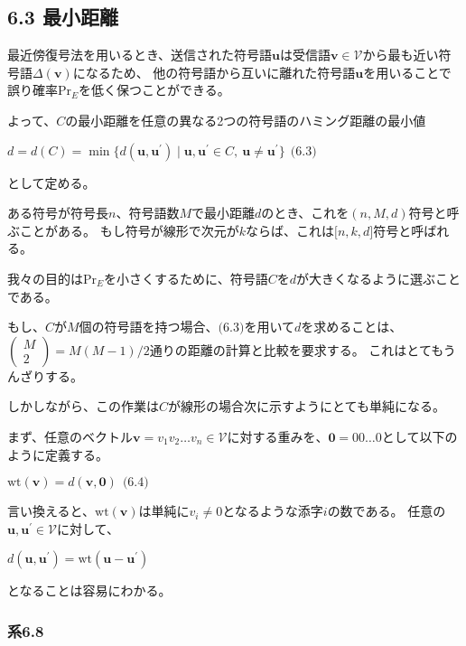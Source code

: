 \documentclass[12pt,a4paper]{article}
\begin{document}
\subsection*{6.3 最小距離}\label{ux6700ux5c0fux8dddux96e2}

最近傍復号法を用いるとき、送信された符号語$\mathbf{u}$は受信語$\mathbf{v} \in \mathcal{V}$から最も近い符号語$\Delta (\mathbf{v})$になるため、
他の符号語から互いに離れた符号語$\mathbf{u}$を用いることで誤り確率$\text{Pr}_E$を低く保つことができる。

よって、$C$の最小距離を任意の異なる2つの符号語のハミング距離の最小値

$d = d(C) = \min \lbrace d(\mathbf{u}, \mathbf{u}^\prime) \mid \mathbf{u}, \mathbf{u}^\prime \in C, \ \mathbf{u} \neq \mathbf{u}^\prime \rbrace \ \ \text{(6.3)}$

として定める。

ある符号が符号長$n$、符号語数$M$で最小距離$d$のとき、これを$(n, M, d)$符号と呼ぶことがある。
もし符号が線形で次元が$k$ならば、これは$\lbrack n, k, d \rbrack$符号と呼ばれる。

我々の目的は$\text{Pr}_E$を小さくするために、符号語$C$を$d$が大きくなるように選ぶことである。

もし、$C$が$M$個の符号語を持つ場合、$\text{(6.3)}$を用いて$d$を求めることは、$\begin{pmatrix} M \\ 2 \end{pmatrix} = M(M - 1)/2$通りの距離の計算と比較を要求する。
これはとてもうんざりする。

しかしながら、この作業は$C$が線形の場合次に示すようにとても単純になる。

まず、任意のベクトル$\mathbf{v} = v_1 v_2 \dots v_n \in \mathcal{V}$に対する重みを、$\mathbf{0} = 00 \dots 0$として以下のように定義する。

$\text{wt} (\mathbf{v}) = d(\mathbf{v}, \mathbf{0}) \ \ \text{(6.4)}$

言い換えると、$\text{wt} (\mathbf{v})$は単純に$v_i \neq 0$となるような添字$i$の数である。
任意の$\mathbf{u}, \mathbf{u}^\prime \in \mathcal{V}$に対して、

$d(\mathbf{u}, \mathbf{u}^\prime) = \text{wt}(\mathbf{u} - \mathbf{u}^\prime)$

となることは容易にわかる。

\subsubsection*{系6.8}\label{ux7cfb6.8}
\end{document}

